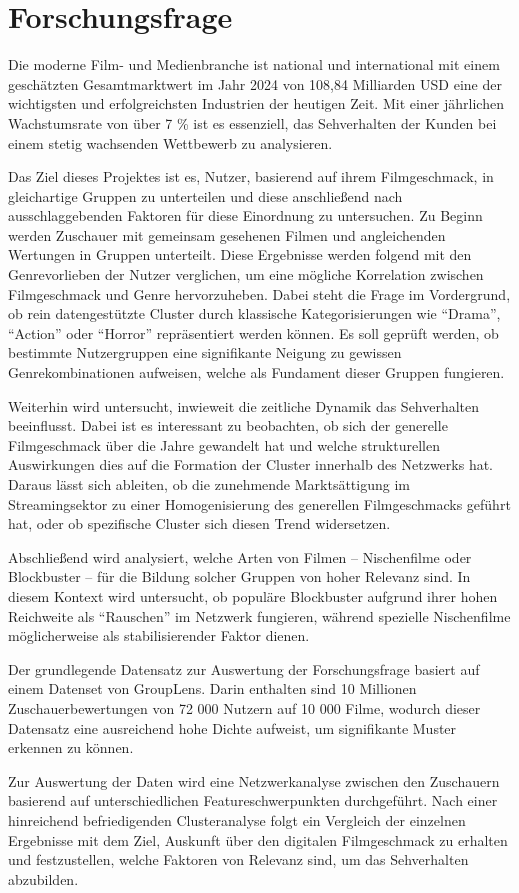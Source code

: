 \section{Forschungsfrage}

Die moderne Film- und Medienbranche ist national und international mit einem geschätzten Gesamtmarktwert im Jahr 2024 von 108,84 Milliarden USD eine der wichtigsten und erfolgreichsten Industrien der heutigen Zeit. \parencite{ZionMarketResearch2024}
Mit einer jährlichen Wachstumsrate von über 7 \% ist es essenziell, das Sehverhalten der Kunden bei einem stetig wachsenden Wettbewerb zu analysieren.

Das Ziel dieses Projektes ist es, Nutzer, basierend auf ihrem Filmgeschmack, in gleichartige Gruppen zu unterteilen und diese anschließend nach ausschlaggebenden Faktoren für diese Einordnung zu untersuchen.
Zu Beginn werden Zuschauer mit gemeinsam gesehenen Filmen und angleichenden Wertungen in Gruppen unterteilt.
Diese Ergebnisse werden folgend mit den Genrevorlieben der Nutzer verglichen, um eine mögliche Korrelation zwischen Filmgeschmack und Genre hervorzuheben.
Dabei steht die Frage im Vordergrund, ob rein datengestützte Cluster durch klassische Kategorisierungen wie \enquote{Drama}, \enquote{Action} oder \enquote{Horror} repräsentiert werden können.
Es soll geprüft werden, ob bestimmte Nutzergruppen eine signifikante Neigung zu gewissen Genrekombinationen aufweisen, welche als Fundament dieser Gruppen fungieren.

Weiterhin wird untersucht, inwieweit die zeitliche Dynamik das Sehverhalten beeinflusst.
Dabei ist es interessant zu beobachten, ob sich der generelle Filmgeschmack über die Jahre gewandelt hat und welche strukturellen Auswirkungen dies auf die Formation der Cluster innerhalb des Netzwerks hat.
Daraus lässt sich ableiten, ob die zunehmende Marktsättigung im Streamingsektor zu einer Homogenisierung des generellen Filmgeschmacks geführt hat, oder ob spezifische Cluster sich diesen Trend widersetzen.

Abschließend wird analysiert, welche Arten von Filmen -- Nischenfilme oder Blockbuster -- für die Bildung solcher Gruppen von hoher Relevanz sind.
In diesem Kontext wird untersucht, ob populäre Blockbuster aufgrund ihrer hohen Reichweite als \enquote{Rauschen} im Netzwerk fungieren, während spezielle Nischenfilme möglicherweise als stabilisierender Faktor dienen.

Der grundlegende Datensatz zur Auswertung der Forschungsfrage basiert auf einem Datenset von GroupLens.
Darin enthalten sind 10 Millionen Zuschauerbewertungen von 72 000 Nutzern auf 10 000 Filme, wodurch dieser Datensatz eine ausreichend hohe Dichte aufweist, um signifikante Muster erkennen zu können.

Zur Auswertung der Daten wird eine Netzwerkanalyse zwischen den Zuschauern basierend auf unterschiedlichen Featureschwerpunkten durchgeführt.
Nach einer hinreichend befriedigenden Clusteranalyse folgt ein Vergleich der einzelnen Ergebnisse mit dem Ziel, Auskunft über den digitalen Filmgeschmack zu erhalten und festzustellen, welche Faktoren von Relevanz sind, um das Sehverhalten abzubilden.

